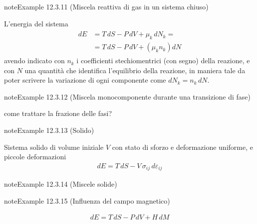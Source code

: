 \documentclass[letterpaper,10pt,italian]{jupyterBook}
\begin{document}
\begin{sphinxadmonition}{note}{Example 12.3.11 (Miscela reattiva di gas in un sistema chiuso)}



\sphinxAtStartPar
L’energia del sistema
\begin{equation*}
\begin{split}\begin{aligned}
  dE & = T \, dS - P \, dV + \mu_k \, dN_k = \\
     & = T \, dS - P \, dV + \left( \mu_k n_k \right) dN
\end{aligned}\end{split}
\end{equation*}
\sphinxAtStartPar
avendo indicato con \(n_k\) i coefficienti stechiomentrici (con segno) della reazione, e con \(N\) una quantità che identifica l’equilibrio della reazione, in maniera tale da poter scrivere la variazione di ogni componente come \(d N_k = n_k \, d N\).
\end{sphinxadmonition}
\label{ch/thermodynamics/principles-gibbs-phase-rule:example-15}
\begin{sphinxadmonition}{note}{Example 12.3.12 (Miscela monocomponente durante una transizione di fase)}



\sphinxAtStartPar
{} come trattare la frazione delle fasi?
\end{sphinxadmonition}
\label{ch/thermodynamics/principles-gibbs-phase-rule:example-16}
\begin{sphinxadmonition}{note}{Example 12.3.13 (Solido)}



\sphinxAtStartPar
Sistema solido di volume iniziale \(V\) con stato di sforzo e deformazione uniforme, e piccole deformazioni
\begin{equation*}
\begin{split}dE = T \, dS - V \, \sigma_{ij} \, d \varepsilon_{ij} \end{split}
\end{equation*}\end{sphinxadmonition}
\label{ch/thermodynamics/principles-gibbs-phase-rule:example-17}
\begin{sphinxadmonition}{note}{Example 12.3.14 (Miscele solide)}



\sphinxAtStartPar
{}
\end{sphinxadmonition}
\label{ch/thermodynamics/principles-gibbs-phase-rule:example-18}
\begin{sphinxadmonition}{note}{Example 12.3.15 (Influenza del campo magnetico)}


\begin{equation*}
\begin{split}dE = T \, dS - P \, d V + H \, dM\end{split}
\end{equation*}
\sphinxAtStartPar
{}
\end{sphinxadmonition}
\end{document}

